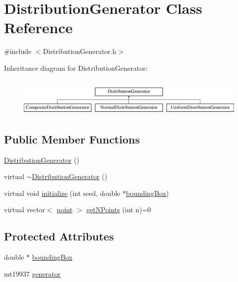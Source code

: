 \hypertarget{class_distribution_generator}{}\section{Distribution\+Generator Class Reference}
\label{class_distribution_generator}


{\ttfamily \#include $<$Distribution\+Generator.\+h$>$}

Inheritance diagram for Distribution\+Generator\+:\begin{figure}[H]
\begin{center}
\leavevmode
\includegraphics[height=1.885522cm]{dc/dc8/class_distribution_generator}
\end{center}
\end{figure}
\subsection*{Public Member Functions}
\begin{DoxyCompactItemize}
\item 
\hyperlink{class_distribution_generator_a9ade678342c897fddf74da6a453cfa7b}{Distribution\+Generator} ()
\item 
virtual \hyperlink{class_distribution_generator_ada1c1b4e9024716e3041ee7836deff65}{$\sim$\+Distribution\+Generator} ()
\item 
virtual void \hyperlink{class_distribution_generator_ae4fa2d599942539e4b1971b0a8d5f8ba}{initialize} (int seed, double $\ast$\hyperlink{class_distribution_generator_abbb670b1d48a4820559097b85bf6ee2d}{bounding\+Box})
\item 
virtual vector$<$ \hyperlink{structpoint}{point} $>$ \hyperlink{class_distribution_generator_a777dcdfd3dee93cfcbcc00969f42ca29}{get\+N\+Points} (int n)=0
\end{DoxyCompactItemize}
\subsection*{Protected Attributes}
\begin{DoxyCompactItemize}
\item 
double $\ast$ \hyperlink{class_distribution_generator_abbb670b1d48a4820559097b85bf6ee2d}{bounding\+Box}
\item 
mt19937 \hyperlink{class_distribution_generator_a875697de8d5c0a4d18e473e483a9646c}{generator}
\end{DoxyCompactItemize}


